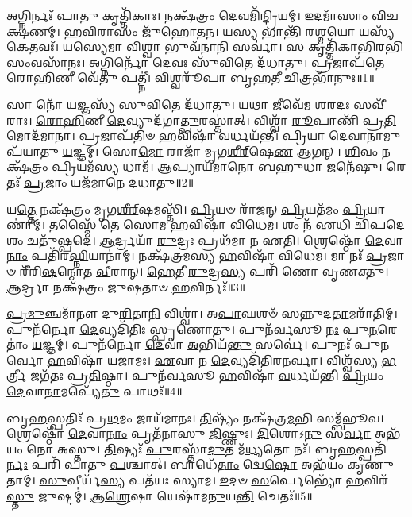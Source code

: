 \setcounter{anuvakam}{0}

\-\ul{𑌅}\-𑌗𑍍𑌨𑌿𑌰𑍍𑌨𑌃᳴ 𑌪𑌾\-\ul{𑌤𑍁} 𑌕𑍃𑌤𑍍𑌤𑌿᳴𑌕𑌾𑌃।
𑌨𑌕𑍍𑌷᳴𑌤𑍍𑌰𑌂 \ul{𑌦𑍇}\-𑌵𑌮𑌿᳴\-\ul{𑌨𑍍𑌦𑍍𑌰𑌿}\-𑌯𑌮𑍍।
\-\ul{𑌇}\-𑌦𑌮𑌾᳴𑌸𑌾𑌂 𑌵𑌿𑌚\-\ul{𑌕𑍍𑌷}\-𑌣𑌮𑍍।
\-\ul{𑌹}\-𑌵𑌿\-\ul{𑌰𑌾}\-𑌸𑌂 𑌜𑍁᳴𑌹𑍋𑌤𑌨।
𑌯\-\ul{𑌸𑍍𑌯} 𑌭𑌾𑌨𑍍𑌤𑌿᳴ \ul{𑌰}\-𑌶𑍍𑌮\-\ul{𑌯𑍋} 𑌯𑌸𑍍𑌯᳴ \ul{𑌕𑍇}\-𑌤𑌵𑌃᳴।
𑌯\-\ul{𑌸𑍍𑌯𑍇}\-𑌮𑌾 𑌵𑌿\-\ul{𑌶𑍍𑌵𑌾} 𑌭𑍁𑌵᳴𑌨𑌾\-\ul{𑌨𑌿} 𑌸𑌰𑍍𑌵𑌾॑।
𑌸 𑌕𑍃𑌤𑍍𑌤𑌿᳴𑌕𑌾𑌭𑌿\-\-\ul{𑌰}\-𑌭𑌿\-\ul{𑌸𑌂}\-𑌵𑌸𑌾᳴𑌨𑌃।
\-\ul{𑌅}\-𑌗𑍍𑌨𑌿𑌰𑍍𑌨𑍋᳴ \ul{𑌦𑍇}\-𑌵𑌃 𑌸𑍁᳴\-\ul{𑌵𑌿}\-𑌤𑍇 𑌦᳴𑌧𑌾𑌤𑍁।
\-\ul{𑌪𑍍𑌰}\-𑌜𑌾𑌪᳴𑌤𑍇 𑌰𑍋\-\ul{𑌹𑌿}\-𑌣𑍀 𑌵𑍇᳴\-\ul{𑌤𑍁} 𑌪𑌤𑍍𑌨𑍀॑।
\-\ul{𑌵𑌿}\-𑌶𑍍𑌵𑌰𑍂᳴𑌪𑌾 𑌬𑍃\-\ul{𑌹}\-𑌤𑍀 \ul{𑌚𑌿}\-𑌤𑍍𑌰𑌭𑌾᳴𑌨𑍁𑌃॥1॥

𑌸𑌾 𑌨𑍋᳴ \ul{𑌯}\-𑌜𑍍𑌞𑌸𑍍𑌯᳴ 𑌸𑍁\-\ul{𑌵𑌿}\-𑌤𑍇 𑌦᳴𑌧𑌾𑌤𑍁।
𑌯\-\ul{𑌥𑌾} 𑌜𑍀𑌵𑍇᳴𑌮 \ul{𑌶}\-𑌰\-\ul{𑌦𑌃} 𑌸𑌵𑍀᳴𑌰𑌾𑌃।
\-\ul{𑌰𑍋}\-\-\ul{𑌹𑌿}\-𑌣𑍀 \ul{𑌦𑍇}\-𑌵𑍍𑌯𑍁𑌦᳴𑌗𑌾\-\ul{𑌤𑍍𑌪𑍁}\-𑌰𑌸𑍍𑌤𑌾॑𑌤𑍍।
𑌵𑌿𑌶𑍍𑌵𑌾᳴ \ul{𑌰𑍂}\-𑌪𑌾𑌣𑌿᳴ 𑌪𑍍𑌰\-\ul{𑌤𑌿}\-𑌮𑍋𑌦᳴𑌮𑌾𑌨𑌾।
\-\ul{𑌪𑍍𑌰}\-𑌜𑌾𑌪᳴𑌤𑌿𑍞 \ul{𑌹}\-𑌵𑌿𑌷𑌾᳴ \ul{𑌵}\-𑌰𑍍𑌧𑌯᳴𑌨𑍍𑌤𑍀।
\-\ul{𑌪𑍍𑌰𑌿}\-𑌯𑌾 \ul{𑌦𑍇}\-𑌵𑌾\-\ul{𑌨𑌾}\-𑌮𑍁𑌪᳴𑌯𑌾𑌤𑍁 \ul{𑌯}\-𑌜𑍍𑌞𑌮𑍍।
𑌸𑍋\-\ul{𑌮𑍋} 𑌰𑌾𑌜𑌾᳴ 𑌮𑍃𑌗\-\ul{𑌶𑍀}\-\-\ul{𑌰𑍍}\-‌𑌷𑍇\-\ul{𑌣} 𑌆𑌗𑌨𑍍।
\-\ul{𑌶𑌿}\-𑌵𑌂 𑌨𑌕𑍍𑌷᳴𑌤𑍍𑌰𑌂 \ul{𑌪𑍍𑌰𑌿}\-𑌯𑌮᳴\-\ul{𑌸𑍍𑌯} 𑌧𑌾𑌮᳴।
\-\ul{𑌆}\-𑌪𑍍𑌯𑌾𑌯᳴𑌮𑌾𑌨𑍋 𑌬\-\ul{𑌹𑍁}\-𑌧𑌾 𑌜𑌨𑍇᳴𑌷𑍁।
𑌰𑍇𑌤𑌃᳴ \ul{𑌪𑍍𑌰}\-𑌜𑌾𑌂 𑌯𑌜᳴𑌮𑌾𑌨𑍇 𑌦𑌧𑌾𑌤𑍁॥2॥

𑌯\-\ul{𑌤𑍍𑌤𑍇} 𑌨𑌕𑍍𑌷᳴𑌤𑍍𑌰𑌂 𑌮𑍃𑌗\-\ul{𑌶𑍀}\-\-\ul{𑌰𑍍}\-‌𑌷𑌮𑌸𑍍𑌤𑌿᳴।
\-\ul{𑌪𑍍𑌰𑌿}\-𑌯𑍞 𑌰𑌾᳴𑌜𑌨𑍍 \ul{𑌪𑍍𑌰𑌿}\-𑌯𑌤᳴𑌮𑌂 \ul{𑌪𑍍𑌰𑌿}\-𑌯𑌾𑌣𑌾॑𑌮𑍍।
𑌤𑌸𑍍𑌮𑍈᳴ 𑌤𑍇 𑌸𑍋𑌮 \ul{𑌹}\-𑌵𑌿𑌷𑌾᳴ 𑌵𑌿𑌧𑍇𑌮।
𑌶𑌂 𑌨᳴ 𑌏𑌧𑌿 \ul{𑌦𑍍𑌵𑌿}\-𑌪\-\ul{𑌦𑍇} 𑌶𑌂 𑌚𑌤𑍁᳴𑌷𑍍𑌪𑌦𑍇।
\-\ul{𑌆}\-𑌰𑍍𑌦𑍍𑌰𑌯𑌾᳴ \ul{𑌰𑍁}\-𑌦𑍍𑌰𑌃 𑌪𑍍𑌰𑌥᳴𑌮𑌾 𑌨 𑌏𑌤𑌿।
𑌶𑍍𑌰𑍇𑌷𑍍𑌠𑍋᳴ \ul{𑌦𑍇}\-𑌵𑌾\-\ul{𑌨𑌾𑌂} 𑌪𑌤𑌿᳴𑌰\-\ul{𑌘𑍍𑌨𑌿}\-𑌯𑌾𑌨𑌾॑𑌮𑍍।
𑌨𑌕𑍍𑌷᳴𑌤𑍍𑌰𑌮𑌸𑍍𑌯 \ul{𑌹}\-𑌵𑌿𑌷𑌾᳴ 𑌵𑌿𑌧𑍇𑌮।
𑌮𑌾 𑌨𑌃᳴ \ul{𑌪𑍍𑌰}\-𑌜𑌾𑍞 𑌰𑍀᳴𑌰𑌿\-\ul{𑌷}\-𑌨𑍍𑌮𑍋𑌤 \ul{𑌵𑍀}\-𑌰𑌾𑌨𑍍।
\-\ul{𑌹𑍇}\-𑌤𑍀 \ul{𑌰𑍁}\-𑌦𑍍𑌰\-\ul{𑌸𑍍𑌯} 𑌪𑌰𑌿᳴ 𑌣𑍋 𑌵𑍃𑌣𑌕𑍍𑌤𑍁।
\-\ul{𑌆}\-𑌰𑍍𑌦𑍍𑌰𑌾 𑌨𑌕𑍍𑌷᳴𑌤𑍍𑌰𑌂 𑌜𑍁𑌷𑌤𑌾𑍞 \ul{𑌹}\-𑌵𑌿𑌰𑍍𑌨𑌃᳴॥3॥

\-\ul{𑌪𑍍𑌰}\-\-\ul{𑌮𑍁}\-𑌞𑍍𑌚𑌮𑌾᳴𑌨𑍗 𑌦𑍁\-\ul{𑌰𑌿}\-𑌤𑌾\-\ul{𑌨𑌿} 𑌵𑌿𑌶𑍍𑌵𑌾॑।
𑌅\-\ul{𑌪𑌾}\-𑌘𑌶𑍞᳴ 𑌸𑌨𑍍𑌨𑍁𑌦\-\ul{𑌤𑌾}\-𑌮𑌰𑌾᳴𑌤𑌿𑌮𑍍।
𑌪𑍁𑌨᳴𑌰𑍍𑌨𑍋 \ul{𑌦𑍇}\-𑌵𑍍𑌯𑌦𑌿᳴𑌤𑌿𑌃 𑌸𑍍𑌪𑍃𑌣𑍋𑌤𑍁।
𑌪𑍁𑌨᳴𑌰𑍍𑌵𑌸𑍂 \ul{𑌨𑌃} 𑌪𑍁\-\ul{𑌨}\-𑌰𑍇𑌤𑌾𑌂॑ \ul{𑌯}\-𑌜𑍍𑌞𑌮𑍍।
𑌪𑍁𑌨᳴𑌰𑍍𑌨𑍋 \ul{𑌦𑍇}\-𑌵𑌾 \ul{𑌅}\-𑌭𑌿𑌯᳴\-\ul{𑌨𑍍𑌤𑍁} 𑌸𑌰𑍍𑌵𑍇॑।
𑌪𑍁𑌨𑌃᳴ 𑌪𑍁𑌨𑌰𑍍𑌵𑍋 \ul{𑌹}\-𑌵𑌿𑌷𑌾᳴ 𑌯𑌜𑌾𑌮𑌃।
\-\ul{𑌏}\-𑌵𑌾 𑌨 \ul{𑌦𑍇}\-𑌵𑍍𑌯𑌦𑌿᳴𑌤𑌿𑌰\-\ul{𑌨}\-𑌰𑍍𑌵𑌾।
𑌵𑌿𑌶𑍍𑌵᳴𑌸𑍍𑌯 \ul{𑌭}\-𑌰𑍍𑌤𑍍𑌰𑍀 𑌜𑌗᳴𑌤𑌃 𑌪𑍍𑌰\-\ul{𑌤𑌿}\-𑌷𑍍𑌠𑌾।
𑌪𑍁𑌨᳴𑌰𑍍𑌵𑌸𑍂 \ul{𑌹}\-𑌵𑌿𑌷𑌾᳴ \ul{𑌵}\-𑌰𑍍𑌧𑌯᳴𑌨𑍍𑌤𑍀।
\-\ul{𑌪𑍍𑌰𑌿}\-𑌯𑌂 \ul{𑌦𑍇}\-𑌵𑌾\-\ul{𑌨𑌾}\-𑌮𑌪𑍍𑌯𑍇᳴\-\ul{𑌤𑍁} 𑌪𑌾𑌥𑌃᳴॥4॥

𑌬𑍃\-\ul{𑌹}\-𑌸𑍍𑌪𑌤𑌿𑌃᳴ 𑌪𑍍𑌰\-\ul{𑌥}\-𑌮𑌂 𑌜𑌾𑌯᳴𑌮𑌾𑌨𑌃।
\-\ul{𑌤𑌿}\-𑌷𑍍𑌯𑌂᳴ 𑌨𑌕𑍍𑌷᳴𑌤𑍍𑌰\-\ul{𑌮}\-𑌭𑌿 𑌸𑌮𑍍𑌬᳴𑌭𑍂𑌵।
𑌶𑍍𑌰𑍇𑌷𑍍𑌠𑍋᳴ \ul{𑌦𑍇}\-𑌵𑌾\-\ul{𑌨𑌾𑌂} 𑌪𑍃𑌤᳴𑌨𑌾𑌸𑍁 \ul{𑌜𑌿}\-𑌷𑍍𑌣𑍁𑌃।
\-\ul{𑌦𑌿}\-𑌶𑍋𑌽\-\ul{𑌨𑍁} 𑌸\-\ul{𑌰𑍍𑌵𑌾} 𑌅𑌭᳴𑌯𑌂 𑌨𑍋 𑌅𑌸𑍍𑌤𑍁।
\-\ul{𑌤𑌿}\-𑌷𑍍𑌯𑌃᳴ \ul{𑌪𑍁}\-𑌰𑌸𑍍𑌤𑌾᳴\-\ul{𑌦𑍁}\-𑌤 𑌮᳴\-\ul{𑌧𑍍𑌯}\-𑌤𑍋 𑌨𑌃᳴।
𑌬𑍃\-\ul{𑌹}\-𑌸𑍍𑌪𑌤𑌿᳴\-\ul{𑌰𑍍𑌨𑌃} 𑌪𑌰𑌿᳴ 𑌪𑌾𑌤𑍁 \ul{𑌪}\-𑌶𑍍𑌚𑌾𑌤𑍍।
𑌬𑌾𑌧𑍇᳴\-\ul{𑌤𑌾𑌂} 𑌦𑍍𑌵𑍇\-\ul{𑌷𑍋} 𑌅𑌭᳴𑌯𑌂 𑌕𑍃𑌣𑍁𑌤𑌾𑌮𑍍।
\-\ul{𑌸𑍁}\-𑌵𑍀𑌰𑍍𑌯᳴\-\ul{𑌸𑍍𑌯} 𑌪𑌤᳴𑌯𑌃 𑌸𑍍𑌯𑌾𑌮।
\-\ul{𑌇}\-𑌦𑍞 \ul{𑌸}\-𑌰𑍍𑌪𑍇𑌭𑍍𑌯𑍋᳴ \ul{𑌹}\-𑌵𑌿𑌰᳴\-\ul{𑌸𑍍𑌤𑍁} 𑌜𑍁𑌷𑍍𑌟𑌮𑍍॑।
\-\ul{𑌆}\-\-\ul{𑌶𑍍𑌰𑍇}\-𑌷𑌾 𑌯𑍇𑌷𑌾᳴𑌮\-\ul{𑌨𑍁}\-𑌯\-\ul{𑌨𑍍𑌤𑌿} 𑌚𑍇𑌤𑌃᳴॥5॥


